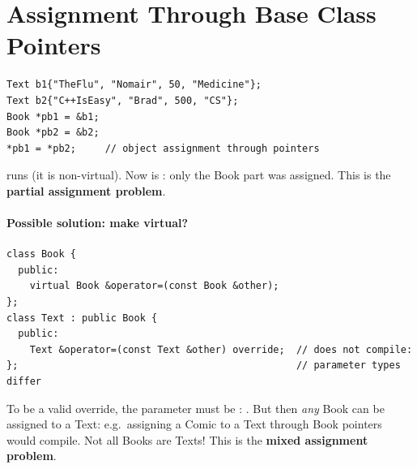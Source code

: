 \section{Assignment Through Base Class Pointers}
\begin{lstlisting}[style=cpp]
Text b1{"TheFlu", "Nomair", 50, "Medicine"};
Text b2{"C++IsEasy", "Brad", 500, "CS"};
Book *pb1 = &b1;
Book *pb2 = &b2;
*pb1 = *pb2;     // object assignment through pointers
\end{lstlisting}
 runs (it is non-virtual). Now  is
: only the Book part was assigned.
This is the \textbf{partial assignment problem}.
\begin{center}
\end{center}

\paragraph{Possible solution: make  virtual?}
\begin{lstlisting}[style=cpp]
class Book {
  public:
    virtual Book &operator=(const Book &other);
};
class Text : public Book {
  public:
    Text &operator=(const Text &other) override;  // does not compile:
};                                                // parameter types differ
\end{lstlisting}
To be a valid override, the parameter must be :
. But then \emph{any} Book
can be assigned to a Text: e.g.\ assigning a Comic to a Text through Book
pointers would compile. Not all Books are Texts! This is the \textbf{mixed
assignment problem}.

